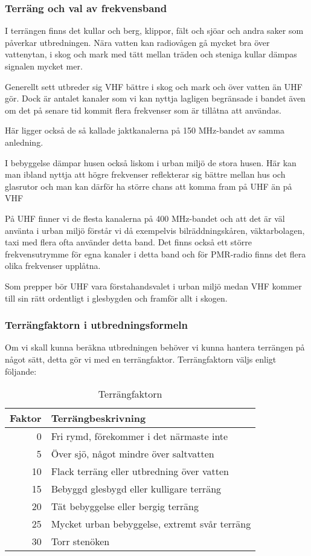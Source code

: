 \documentclass[12ypt,swedish,a4paper]{report}
\begin{document}
\subsubsection{Terräng och val av frekvensband}

I terrängen finns det kullar och berg, klippor, fält och sjöar och andra saker som påverkar utbredningen. Nära vatten kan radiovågen gå mycket bra över vattenytan, i skog och mark med tätt mellan träden och steniga kullar dämpas signalen mycket mer.

Generellt sett utbreder sig VHF bättre i skog och mark och över vatten än UHF gör. Dock är antalet kanaler som vi kan nyttja lagligen begränsade i bandet även om det på senare tid kommit flera frekvenser som är tillåtna att användas.

Här ligger också de så kallade jaktkanalerna på 150 MHz-bandet av samma anledning.

I bebyggelse dämpar husen också liskom i urban miljö de stora husen. Här kan man ibland nyttja att högre frekvenser reflekterar sig bättre mellan hus och glasrutor och man kan därför ha större chans att komma fram på UHF än på VHF

På UHF finner vi de flesta kanalerna på 400 MHz-bandet och att det är väl använta i urban miljö förstår vi då exempelvis bilräddningskåren, väktarbolagen, taxi med flera ofta använder detta band. Det finns också ett större frekvensutrymme för egna kanaler i detta band och för PMR-radio finns det flera olika frekvenser upplåtna.

Som prepper bör UHF vara förstahandsvalet i urban miljö medan VHF kommer till sin rätt ordentligt i glesbygden och framför allt i skogen.

\subsubsection{Terrängfaktorn i utbredningsformeln}

Om vi skall kunna beräkna utbredningen behöver vi kunna hantera terrängen på något sätt, detta gör vi med en terrängfaktor. Terrängfaktorn väljs enligt följande:

\begin{table}[h]
\centering
\begin{tabular}{rl}
	Faktor & Terrängbeskrivning                            \\ \hline
	     0 & Fri rymd, förekommer i det närmaste inte      \\
	     5 & Över sjö, något mindre över saltvatten        \\
	    10 & Flack terräng eller utbredning över vatten    \\
	    15 & Bebyggd glesbygd eller kulligare terräng      \\
	    20 & Tät bebyggelse eller bergig terräng           \\
	    25 & Mycket urban bebyggelse, extremt svår terräng \\
	    30 & Torr stenöken
\end{tabular}
\caption{Terrängfaktorn}
\end{table}
\end{document}
